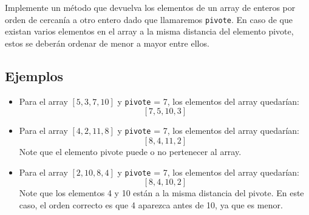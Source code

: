 Implemente un método que devuelva los elementos de un array de enteros por orden de cercanía a otro entero dado que llamaremos \texttt{pivote}. En caso de que existan varios elementos en el array a la misma distancia del elemento pivote, estos se deberán ordenar de menor a mayor entre ellos.

\subsection*{Ejemplos}

\begin{itemize}
    \item Para el array \([5, 3, 7, 10]\) y \texttt{pivote} = 7, los elementos del array quedarían: 
    \[
    [7,5,10,3]
    \]
    
    \item Para el array \([4, 2, 11, 8]\) y \texttt{pivote} = 7, los elementos del array quedarían:
    \[
    [8, 4, 11, 2]
    \]
    Note que el elemento pivote puede o no pertenecer al array.

    \item Para el array \([2, 10, 8, 4]\) y \texttt{pivote} = 7, los elementos del array quedarían:
    \[
    [8, 4, 10, 2]
    \]
    Note que los elementos 4 y 10 están a la misma distancia del pivote. En este caso, el orden correcto es que 4 aparezca antes de 10, ya que es menor.
\end{itemize}